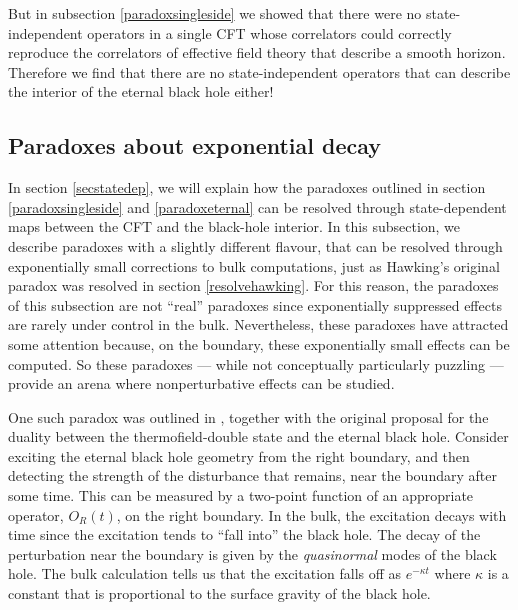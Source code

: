 \documentclass[12pt]{article}
\begin{document}
But in subsection \ref{paradoxsingleside} we showed that there were no state-independent operators in a single CFT whose correlators could correctly reproduce the correlators of effective field theory that describe a smooth horizon.  Therefore we find that there are no state-independent operators that can describe the interior of the eternal black hole either!






\subsection{Paradoxes about exponential decay \label{paradoxexponential}}

In section \ref{secstatedep}, we will explain how the paradoxes outlined in section \ref{paradoxsingleside} and \ref{paradoxeternal} can be resolved through state-dependent maps between the CFT and the black-hole interior. In this subsection, we describe paradoxes with a slightly different flavour, that can be resolved through exponentially small corrections to bulk computations, just as Hawking's original paradox was resolved in section \ref{resolvehawking}. For this reason, the paradoxes of this subsection  are not ``real'' paradoxes since exponentially suppressed effects are rarely under control in the bulk. Nevertheless, these paradoxes have attracted some attention because, on the boundary,
these exponentially small effects can be computed. So these paradoxes --- while not conceptually particularly puzzling --- provide an arena where nonperturbative effects can be studied.

One such paradox was outlined in \cite{Maldacena:2001kr}, together with the original proposal for the duality between the thermofield-double state and the eternal black hole. Consider exciting the eternal black hole geometry from the right boundary, and then detecting the strength of the disturbance that remains, near the boundary  after some time. This can be measured by a two-point function of an appropriate operator, $O_R(t)$, on the right boundary.   In the bulk, the excitation decays with time since the excitation tends to ``fall into'' the black hole. The decay of the perturbation near the boundary is given by the {\em quasinormal} modes \cite{Berti:2009kk,Kokkotas:1999bd,Horowitz:1999jd} of the black hole.  The bulk calculation tells us that the excitation falls off as $e^{-\kappa t}$ where $\kappa$ is a constant that is proportional to the surface gravity of the black hole.
\end{document}
